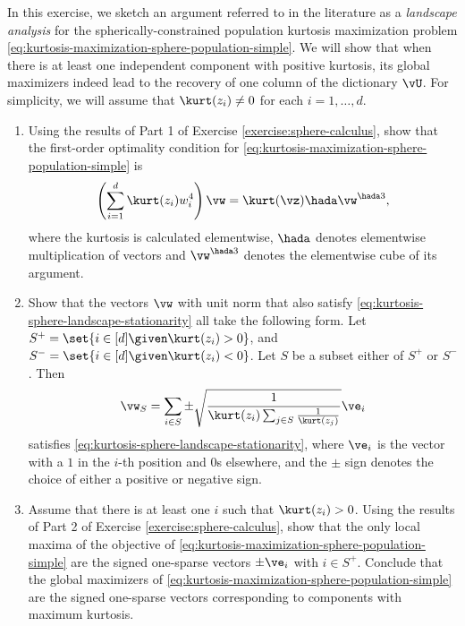 \documentclass[../../book-main.tex]{subfiles}
\begin{document}
\begin{exercise}\label{exercise:kurtosis-sphere-landscape}
    In this exercise, we sketch an argument referred to in the literature as a \textit{landscape analysis} for the spherically-constrained population kurtosis maximization problem \eqref{eq:kurtosis-maximization-sphere-population-simple}. We will show that when there is at least one independent component with positive kurtosis, its 
    global maximizers indeed lead to the recovery of one column of the dictionary $\vU$.
    For simplicity, we will assume that $\kurt(z_i) \neq 0$ for each $i = 1, \dots, d$.
    \begin{enumerate}
        \item Using the results of Part 1 of Exercise \ref{exercise:sphere-calculus}, 
        show that the first-order optimality condition for \eqref{eq:kurtosis-maximization-sphere-population-simple} is
        \begin{equation}\label{eq:kurtosis-sphere-landscape-stationarity}
            \left(\sum_{i=1}^d \kurt(z_i) w_i^4 \right) 
            \vw = \kurt(\vz) \hada \vw^{\hada 3}, 
        \end{equation}
        where the kurtosis is calculated elementwise, $\hada$ denotes elementwise multiplication of vectors and $\vw^{\hada 3}$ denotes the elementwise cube of its argument.
        \item Show that the vectors $\vw$ with unit norm that also satisfy \eqref{eq:kurtosis-sphere-landscape-stationarity}
        all take the following form.
        Let $S^+ = \set{i \in [d] \given \kurt(z_i) > 0}$, and 
        $S^- = \set{i \in [d] \given \kurt(z_i) < 0}$.
        Let $S$ be a subset either of $S^+$ or $S^-$.
        Then 
        \begin{equation}\label{eq:kurtosis-sphere-landscape-cps}
            \vw_S = \sum_{i \in S} \pm \sqrt{\frac{1}{\kurt(z_i) \sum_{j \in S} \frac{1}{\kurt(z_j)}}} \ve_i
        \end{equation}
        satisfies \eqref{eq:kurtosis-sphere-landscape-stationarity},
        where $\ve_i$ is the vector with a $1$ in the $i$-th position and $0$s elsewhere, and the $\pm$ sign denotes the choice of either a positive or negative sign.
        \item Assume that there is at least one $i$ such that $\kurt(z_i) > 0$. Using the results of Part 2 of Exercise \ref{exercise:sphere-calculus}, show that the only local maxima of the objective of \eqref{eq:kurtosis-maximization-sphere-population-simple} are the signed one-sparse vectors $\pm \ve_i$ with $i \in S^+$. Conclude that the global maximizers of \eqref{eq:kurtosis-maximization-sphere-population-simple} are the signed one-sparse vectors corresponding to components with maximum kurtosis. %

\end{enumerate}
\end{exercise}
\end{document}
